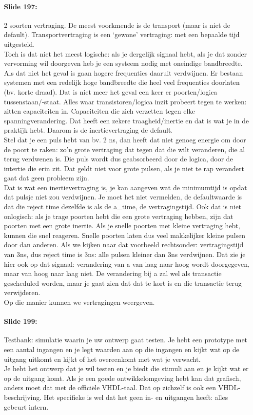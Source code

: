 \documentclass[10pt,a4paper]{book}
\begin{document}
\paragraph{Slide 197:} 2 soorten vertraging. De meest voorkmende is de transport (maar is niet de default). Transportvertraging is een `gewone' vertraging: met een bepaalde tijd uitgesteld.\\
Toch is dat niet het meest logische: als je dergelijk signaal hebt, als je dat zonder vervorming wil doorgeven heb je een systeem nodig met oneindige bandbreedte. Als dat niet het geval is gaan hogere frequenties daaruit verdwijnen. Er bestaan systemen met een redelijk hoge bandbreedte die heel veel frequenties doorlaten (bv. korte draad). Dat is niet meer het geval een keer er poorten/logica tussenstaan/-staat. Alles waar transistoren/logica inzit probeert tegen te werken: zitten capaciteiten in. Capaciteiten die zich verzetten tegen elke spanningverandering. Dat heeft een zekere traagheid/inertie en dat is wat je in de praktijk hebt. Daarom is de inertievertraging de default.\\
Stel dat je een puls hebt van bv. 2 ns, dan heeft dat niet genoeg energie om door de poort te raken: zo'n grote vertraging dat tegen dat die wilt veranderen, die al terug verdwenen is. Die puls wordt dus geabsorbeerd door de logica, door de intertie die erin zit. Dat geldt niet voor grote pulsen, als je niet te rap verandert gaat dat geen probleem zijn.\\
Dat is wat een inertievertraging is, je kan aangeven wat de minimumtijd is opdat dat pulsje niet zou verdwijnen. Je moet het niet vermelden, de defaultwaarde is dat die reject time dezelfde is als de a\_time, de vertragingstijd. Ook dat is niet onlogisch: als je trage poorten hebt die een grote vertraging hebben, zijn dat poorten met een grote inertie. Als je snelle poorten met kleine vertraging hebt, kunnen die snel reageren. Snelle poorten laten dus veel makkelijker kleine pulsen door dan anderen. Als we kijken naar dat voorbeeld rechtsonder: vertragingstijd van 3ns, dus reject time is 3ns: alle pulsen kleiner dan 3ns verdwijnen. Dat zie je hier ook op dat signaal: verandering van a van laag naar hoog wordt doorgegeven, maar van hoog naar laag niet. De verandering bij a zal wel als transactie gescheduled worden, maar je gaat zien dat dat te kort is en die transactie terug verwijderen.\\
Op die manier kunnen we vertragingen weergeven.

\paragraph{Slide 199:} Testbank: simulatie waarin je uw ontwerp gaat testen. Je hebt een prototype met een aantal ingangen en je legt waarden aan op die ingangen en kijkt wat op de uitgang uitkomt en kijkt of het overeenkomt met wat je verwacht.\\
Je hebt het ontwerp dat je wil testen en je biedt die stimuli aan en je kijkt wat er op de uitgang komt. Als je een goede ontwikkelomgeving hebt kan dat grafisch, anders moet dat met de offici\"ele VHDL-taal. Dat op zichzelf is ook een VHDL-beschrijving. Het specifieke is wel dat het geen in- en uitgangen heeft: alles gebeurt intern.
\end{document}
